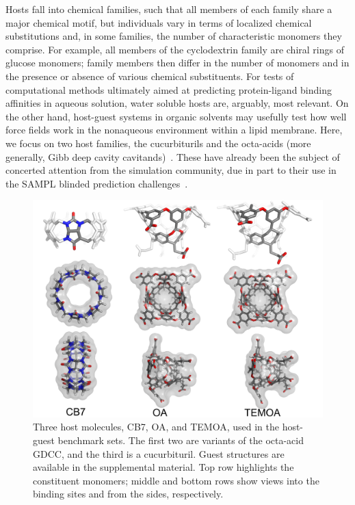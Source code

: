 \documentclass[aps,pre,twocolumn,nofootinbib,superscriptaddress,10pt, final,tightenlines]{revtex4-1}
\begin{document}
Hosts fall into chemical families, such that all members of each family share a major chemical motif, but individuals vary in terms of localized chemical substitutions and, in some families, the number of characteristic monomers they comprise.  
For example, all members of the cyclodextrin family are chiral rings of glucose monomers; family members then differ in the number of monomers and in the presence or absence of various chemical substituents. 
For tests of computational methods ultimately aimed at predicting protein-ligand binding affinities in aqueous solution, water soluble hosts are, arguably, most relevant. 
On the other hand, host-guest systems in organic solvents may usefully test how well force fields work in the nonaqueous environment within a lipid membrane. 
Here, we focus on two host families, the cucurbiturils \cite{freeman_cucurbituril_1981,mock_host-guest_1983} and the octa-acids (more generally, Gibb deep cavity cavitands)~\cite{gibb_well-defined_2004, hillyer_synthesis_2016}. 
These have already been the subject of concerted attention from the simulation community, due in part to their use in the SAMPL blinded prediction challenges~\cite{muddana_sampl3_2012, muddana_sampl4_2014, yin_overview_2016}.  

\begin{figure}
\includegraphics[width=\textwidth]{figures/hosts.pdf}
\caption{\label{hosts}
Three host molecules, CB7, OA, and TEMOA, used in the host-guest benchmark sets.
The first two are variants of the octa-acid GDCC, and the third is a cucurbituril.
Guest structures are available in the supplemental material.
Top row highlights the constituent monomers; middle and bottom rows show views into the binding sites and from the sides, respectively.
}
\end{figure}
\end{document}
